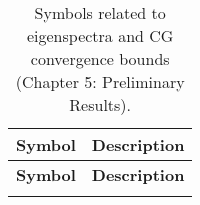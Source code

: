 \begin{longtable}{c p{10cm}}
    \caption{Symbols related to eigenspectra and CG convergence bounds (Chapter 5: Preliminary Results).}\label{tab:eigenspectra_symbols}                                                         \\
    \hline
    \textbf{Symbol}          & \textbf{Description}                                                                                                                                               \\
    \hline
    \endfirsthead

    \hline
    \textbf{Symbol}          & \textbf{Description}                                                                                                                                               \\
    \hline
    \endhead

    \hline
    \endfoot

    \hline
    \endlastfoot


\end{longtable}
